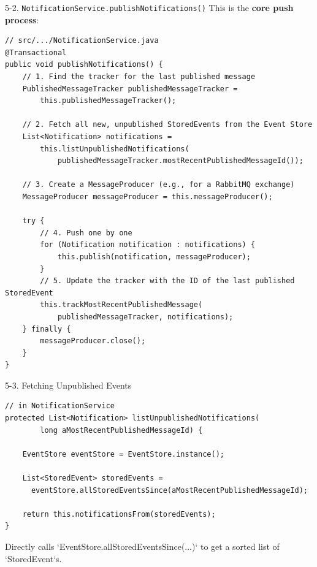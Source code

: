 \documentclass{beamer}
\begin{document}
\begin{frame}[fragile]{5-2. \texttt{NotificationService.publishNotifications()}}
  This is the \textbf{core push process}:
  \lstset{language=Java, basicstyle=\ttfamily\tiny}
  \begin{lstlisting}
// src/.../NotificationService.java
@Transactional
public void publishNotifications() {
    // 1. Find the tracker for the last published message
    PublishedMessageTracker publishedMessageTracker =
        this.publishedMessageTracker();

    // 2. Fetch all new, unpublished StoredEvents from the Event Store
    List<Notification> notifications =
        this.listUnpublishedNotifications(
            publishedMessageTracker.mostRecentPublishedMessageId());

    // 3. Create a MessageProducer (e.g., for a RabbitMQ exchange)
    MessageProducer messageProducer = this.messageProducer();

    try {
        // 4. Push one by one
        for (Notification notification : notifications) {
            this.publish(notification, messageProducer);
        }
        // 5. Update the tracker with the ID of the last published StoredEvent
        this.trackMostRecentPublishedMessage(
            publishedMessageTracker, notifications);
    } finally {
        messageProducer.close();
    }
}
  \end{lstlisting}
\end{frame}

\begin{frame}[fragile]{5-3. Fetching Unpublished Events}
  \lstset{language=Java, basicstyle=\ttfamily\scriptsize}
  \begin{lstlisting}
// in NotificationService
protected List<Notification> listUnpublishedNotifications(
        long aMostRecentPublishedMessageId) {

    EventStore eventStore = EventStore.instance();

    List<StoredEvent> storedEvents =
      eventStore.allStoredEventsSince(aMostRecentPublishedMessageId);

    return this.notificationsFrom(storedEvents);
}
  \end{lstlisting}
  Directly calls `EventStore.allStoredEventsSince(...)` to get a sorted list of `StoredEvent`s.
\end{frame}
\end{document}
